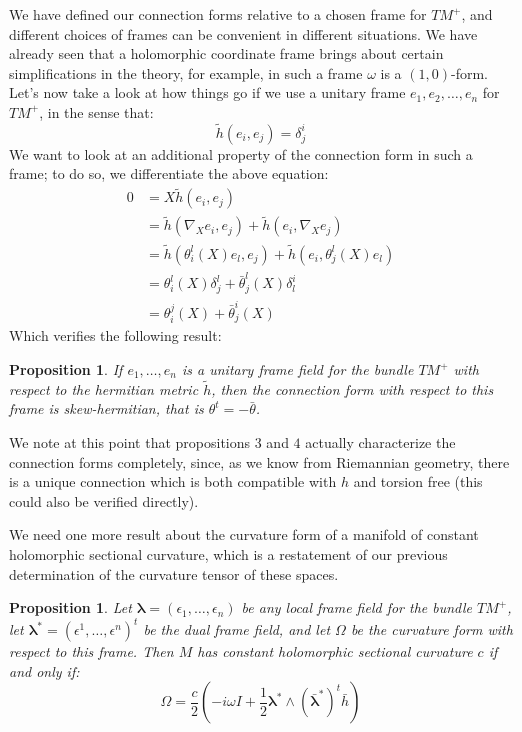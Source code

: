 \documentclass[11pt]{amsart}
\newtheorem{prop}[subsection]{Proposition}
\theoremstyle{definition}
\def \hsquig{ \tilde{h} }
\def \bldepsilon{ \mathbf{\lambda}}
\begin{document}
We have defined our connection forms relative to a chosen frame for $TM^{+}$, and different choices of frames can be convenient in different situations.  We have already seen that a holomorphic coordinate frame brings about certain simplifications in the theory, for example, in such a frame $\omega$ is a $(1,0)$-form.  Let's now take a look at how things go if we use a unitary frame $e_1, e_2, \ldots, e_n$ for $TM^{+}$, in the sense that:
%
$$ \hsquig ( e_i, e_j ) = \delta^i_j $$
%
We want to look at an additional property of the connection form in such a frame; to do so, we differentiate the above equation:
%
\begin{align*}
0 &= X \hsquig ( e_i, e_j ) \\
&= \hsquig ( \nabla_X e_i, e_j ) + \hsquig ( e_i, \nabla_X e_j ) \\
&= \hsquig ( \theta^l_i (X) e_l, e_j ) + \hsquig ( e_i, \theta^l_j (X) e_l ) \\
&= \theta^l_i (X) \delta^l_j + \bar{\theta}^l_j (X) \delta^i_l \\
&= \theta^j_i (X) + \bar{\theta}^i_j (X)
\end{align*}
%
Which verifies the following result:
%
\begin{prop} If $e_1, \ldots, e_n$ is a unitary frame field for the bundle $TM^{+}$ with respect to the hermitian metric $\hsquig$, then the connection form with respect to this frame is skew-hermitian, that is $ \theta^{t} = - \bar{ \theta } $.
\end{prop}

We note at this point that propositions $3$ and $4$ actually characterize the connection forms completely, since, as we know from Riemannian geometry, there is a unique connection which is both compatible with $h$ and torsion free (this could also be verified directly).

We need one more result about the curvature form of a manifold of constant holomorphic sectional curvature, which is a restatement of our previous determination of the curvature tensor of these spaces.

\begin{prop}  Let $\bldepsilon = (\epsilon_1, \ldots, \epsilon_n )$ be any local frame field for the bundle $TM^{+}$, let $\bldepsilon^{\ast} = ( \epsilon^1, \ldots, \epsilon^n )^{t} $ be the dual frame field, and let $\Omega$ be the curvature form with respect to this frame.  Then $M$ has constant holomorphic sectional curvature $c$ if and only if:
%
$$ \Omega = \frac{c}{2} \left( - i \omega I + \frac{1}{2} \bldepsilon^{\ast} \wedge (\bar{ \bldepsilon }^{\ast})^{t} \bar{h} \right) $$
%
\end{prop}
\end{document}
